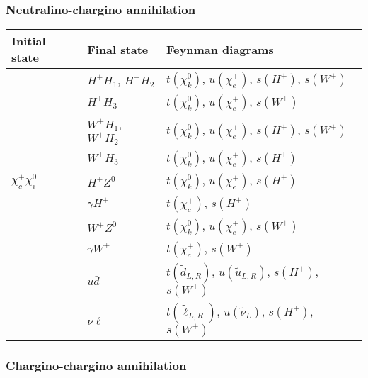\subsubsection{Neutralino-chargino annihilation}

\begin{center}
\begin{tabular}{lll} \hline 
  Initial state & Final state & Feynman diagrams \\ \hline \tabspace
   & $H^+ H_1$, $H^+ H_2$ &
  $t(\chi_k^0)$, $u(\chi_e^+)$, $s(H^+)$, $s(W^+)$ \\
   & $H^+ H_3$ &
  $t(\chi_k^0)$, $u(\chi_e^+)$, $s(W^+)$ \\
   & $W^+ H_1$, $W^+ H_2$ &
  $t(\chi_k^0)$, $u(\chi_e^+)$, $s(H^+)$, $s(W^+)$ \\
   & $W^+ H_3$ &
  $t(\chi_k^0)$, $u(\chi_e^+)$, $s(H^+)$ \\
  $\chi_c^+ \chi_i^0$ & $H^+ Z^0$ &
  $t(\chi_k^0)$, $u(\chi_e^+)$, $s(H^+)$ \\
   & $\gamma H^+$ &
  $t(\chi_c^+)$, $s(H^+)$ \\
   & $W^+ Z^0$ &
  $t(\chi_k^0)$, $u(\chi_e^+)$, $s(W^+)$ \\
   & $\gamma W^+$ &
  $t(\chi_c^+)$, $s(W^+)$ \\
   & $u \bar{d}$ &
  $t(\tilde{d}_{L,R})$, $u(\tilde{u}_{L,R})$, $s(H^+)$, $s(W^+)$ \\
   & $\nu \bar{\ell}$ &
  $t(\tilde{\ell}_{L,R})$, $u(\tilde{\nu}_{L})$, $s(H^+)$, $s(W^+)$
  \\ \hline
\end{tabular}
\end{center}


\subsubsection{Chargino-chargino annihilation}

